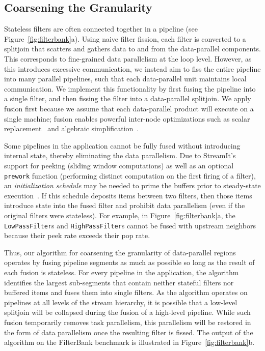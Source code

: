 \subsection{Coarsening the Granularity}

Stateless filters are often connected together in a pipeline (see
Figure~\ref{fig:filterbank}a).  Using naive filter fission, each
filter is converted to a splitjoin that scatters and gathers data to
and from the data-parallel components.  This corresponds to
fine-grained data parallelism at the loop level.  However, as this
introduces excessive communication, we instead aim to fiss the entire
pipeline into many parallel pipelines, such that each data-parallel
unit maintains local communication.  We implement this functionality
by first fusing the pipeline into a single filter, and then fissing
the filter into a data-parallel splitjoin.  We apply fusion first
because we assume that each data-parallel product will execute on a
single machine; fusion enables powerful inter-node optimizations such
as scalar replacement~\cite{sermulins:lctes:2005} and algebraic
simplification~\cite{agrawal:cases:2005,lamb:pldi:2003}.

Some pipelines in the application cannot be fully fused without
introducing internal state, thereby eliminating the data parallelism.
Due to StreamIt's support for peeking (sliding window computations) as
well as an optional {\tt prework} function (performing distinct
computation on the first firing of a filter), an {\it initialization
schedule} may be needed to prime the buffers prior to steady-state
execution~\cite{karczma-thesis}.  If this schedule deposits items
between two filters, then those items introduce state into the fused
filter and prohibit data parallelism (even if the original filters
were stateless).  For example, in Figure~\ref{fig:filterbank}a, the
{\tt LowPassFilter}s and {\tt HighPassFilter}s cannot be fused with
upstream neighbors because their peek rate exceeds their pop rate.

Thus, our algorithm for coarsening the granularity of data-parallel
regions operates by fusing pipeline segments as much as possible so
long as the result of each fusion is stateless.  For every pipeline in
the application, the algorithm identifies the largest sub-segments
that contain neither stateful filters nor buffered items and fuses
them into single filters.  As the algorithm operates on pipelines at
all levels of the stream hierarchy, it is possible that a low-level
splitjoin will be collapsed during the fusion of a high-level
pipeline.  While such fusion temporarily removes task parallelism,
this parallelism will be restored in the form of data parallelism once
the resulting filter is fissed.  The output of the algorithm on the
FilterBank benchmark is illustrated in Figure~\ref{fig:filterbank}b.

